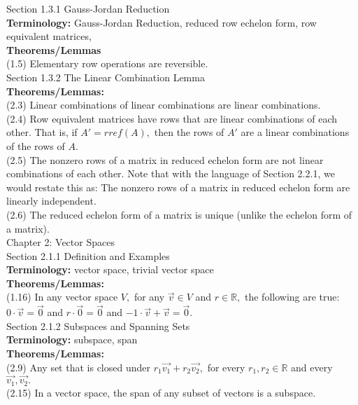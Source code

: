 \documentclass[11pt,fleqn]{article}
\begin{document}
\noindent Section 1.3.1 Gauss-Jordan Reduction\\

\textbf{Terminology:} Gauss-Jordan Reduction, reduced row echelon form, row equivalent matrices, \\

\textbf{Theorems/Lemmas} \\
(1.5) Elementary row operations are reversible.\\

\noindent Section 1.3.2 The Linear Combination Lemma\\

\textbf{Theorems/Lemmas:} \\
(2.3) Linear combinations of linear combinations are linear combinations.\\
(2.4) Row equivalent matrices have rows that are linear combinations of each other. That is, if $A'=rref(A),$ then the rows of $A'$ are a linear combinations of the rows of $A.$\\
(2.5) The nonzero rows of a matrix in reduced echelon form are not linear combinations of each other. Note that with the language of Section 2.2.1, we would restate this as: The nonzero rows of a matrix in reduced echelon form are linearly independent.\\
(2.6) The reduced echelon form of a matrix is unique (unlike the echelon form of a matrix).\\


\noindent Chapter 2: Vector Spaces\\

\noindent Section 2.1.1 Definition and Examples\\

\textbf{Terminology:} vector space, trivial vector space\\

\textbf{Theorems/Lemmas:} \\
(1.16) In any vector space $V,$ for any $\vec{v} \in V$ and $r \in \mathbb{R},$ the following are true: $0 \cdot \vec{v}=\vec{0}$ and $r \cdot \vec{0} = \vec{0}$ and $-1\cdot \vec{v} + \vec{v} = \vec{0}.$\\


\noindent Section 2.1.2 Subspaces and Spanning Sets\\

\textbf{Terminology:}  subspace, span\\

\textbf{Theorems/Lemmas:} \\
(2.9) Any set that is closed under $r_1\vec{v_1}+r_2\vec{v_2},$ for every $r_1,r_2 \in \mathbb{R}$ and every $\vec{v_1},\vec{v_2}.$\\
(2.15) In a vector space, the span of any subset of vectors is a subspace.\\
\end{document}
